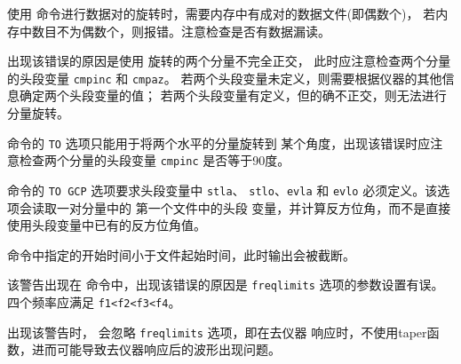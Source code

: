 使用  命令进行数据对的旋转时，需要内存中有成对的数据文件(即偶数个)，
若内存中数目不为偶数个，则报错。注意检查是否有数据漏读。

出现该错误的原因是使用  旋转的两个分量不完全正交，
此时应注意检查两个分量的头段变量 \texttt{cmpinc} 和 \texttt{cmpaz}。
若两个头段变量未定义，则需要根据仪器的其他信息确定两个头段变量的值；
若两个头段变量有定义，但的确不正交，则无法进行分量旋转。

 命令的 \texttt{TO} 选项只能用于将两个水平的分量旋转到
某个角度，出现该错误时应注意检查两个分量的头段变量 \texttt{cmpinc} 是否等于90度。

 命令的 \texttt{TO GCP} 选项要求头段变量中 \texttt{stla}、
\texttt{stlo}、\texttt{evla} 和 \texttt{evlo} 必须定义。该选项会读取一对分量中的
第一个文件中的头段
变量，并计算反方位角，而不是直接使用头段变量中已有的反方位角值。

 命令中指定的开始时间小于文件起始时间，此时输出会被截断。

该警告出现在  命令中，出现该错误的原因是 \texttt{freqlimits}
选项的参数设置有误。四个频率应满足 \texttt{f1<f2<f3<f4}。

出现该警告时， 会忽略 \texttt{freqlimits} 选项，即在去仪器
响应时，不使用taper函数，进而可能导致去仪器响应后的波形出现问题。